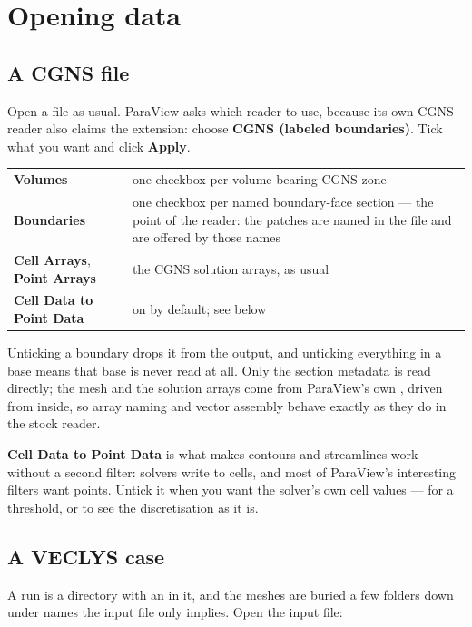 \documentclass[11pt,a4paper]{article}
\newcommand{\prop}[1]{\textbf{#1}}          %
\newcommand{\menu}[1]{\textbf{#1}}          %
\begin{document}
\section{Opening data}

\subsection{A CGNS file}

Open a  file as usual. ParaView asks which reader to use, because
its own CGNS reader also claims the extension: choose \menu{CGNS (labeled
boundaries)}. Tick what you want and click \menu{Apply}.

\begin{center}
\begin{tabular}{@{}L{34mm}L{92mm}@{}}
\toprule
\prop{Volumes} & one checkbox per volume-bearing CGNS zone \\
\prop{Boundaries} & one checkbox per named boundary-face section --- the point
  of the reader: the patches are named in the file and are offered by those
  names \\
\prop{Cell Arrays}, \prop{Point Arrays} & the CGNS solution arrays, as usual \\
\prop{Cell Data to Point Data} & on by default; see below \\
\bottomrule
\end{tabular}
\end{center}

Unticking a boundary drops it from the output, and unticking everything in a
base means that base is never read at all. Only the section metadata is read
directly; the mesh and the solution arrays come from ParaView's own
, driven from inside, so array naming and vector assembly
behave exactly as they do in the stock reader.

\prop{Cell Data to Point Data} is what makes contours and streamlines work
without a second filter: solvers write to cells, and most of ParaView's
interesting filters want points. Untick it when you want the solver's own cell
values --- for a threshold, or to see the discretisation as it is.

\subsection{A VECLYS case}

A run is a directory with an  in it, and the meshes are buried
a few folders down under names the input file only implies. Open the input file:
\end{document}
